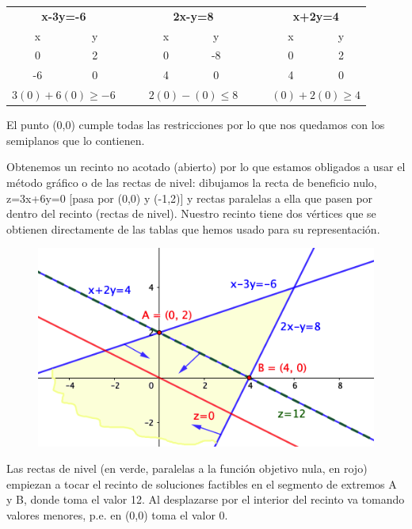 \vspace{5mm} 
\begin{table}[H]
	\centering
	\begin{tabular}{cccccccc}
	\multicolumn{2}{c}{\textbf{x-3y=-6}}  & \textbf{} & \multicolumn{2}{c}{\textbf{2x-y=8}} & \textbf{} & \multicolumn{2}{c}{\textbf{x+2y=4}} \\
	\multicolumn{1}{c|}{x}        & y     & $\quad$   & \multicolumn{1}{c|}{x}     & y      & $\quad$   & \multicolumn{1}{c|}{x}      & y     \\ \cline{1-2} \cline{4-5} \cline{7-8} 
	\multicolumn{1}{c|}{0}        & 2     &           & \multicolumn{1}{c|}{0}     & -8     &           & \multicolumn{1}{c|}{0}      & 2     \\
	\multicolumn{1}{c|}{-6}       & 0     &           & \multicolumn{1}{c|}{4}     & 0      &           & \multicolumn{1}{c|}{4}      & 0     \\
	\multicolumn{2}{c}{$3(0)+6(0)\ge -6$} &           & \multicolumn{2}{c}{$2(0)-(0)\le 8$} &           & \multicolumn{2}{c}{$(0)+2(0)\ge 4$}
	\end{tabular}
	\end{table}
\vspace{5mm} El punto (0,0) cumple todas las restricciones por lo que nos quedamos con los semiplanos que lo contienen.
\vspace{5mm} 
\begin{multicols}{2}
Obtenemos un recinto no acotado (abierto) por lo que estamos obligados a usar el método gráfico o de las rectas de nivel: dibujamos la recta de beneficio nulo, z=3x+6y=0 [pasa por (0,0) y (-1,2)] y rectas paralelas a ella que pasen por dentro del recinto (rectas de nivel). Nuestro recinto tiene dos vértices que se obtienen directamente de las tablas que hemos usado para su representación.	
	\begin{figure}[H]
	\centering
	\includegraphics[width=.5\textwidth]{imagenes/img29.png}
\end{figure}
\end{multicols}

\vspace{5mm} Las rectas de nivel (en verde, paralelas a la función objetivo nula, en rojo) empiezan a tocar el recinto de soluciones factibles en el segmento de extremos A y B, donde toma el valor 12. Al desplazarse por  el interior del recinto va tomando valores menores, p.e. en (0,0) toma el valor 0.

